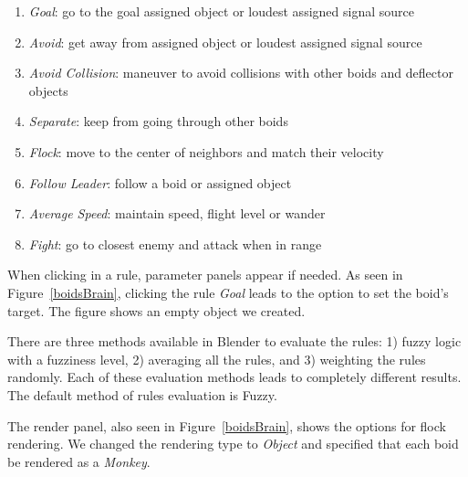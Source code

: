 \begin{enumerate}
\item{\textit{Goal}: go to the goal assigned object or loudest assigned signal source}
\item{\textit{Avoid}: get away from assigned object or loudest assigned signal source}
\item{\textit{Avoid Collision}: maneuver to avoid collisions with other boids and deflector objects} %
\item{\textit{Separate}: keep from going through other boids}
\item{\textit{Flock}: move to the center of neighbors and match their velocity}
\item{\textit{Follow Leader}: follow a boid or assigned object}
\item{\textit{Average Speed}: maintain speed, flight level or wander}
\item{\textit{Fight}: go to closest enemy and attack when in range}
\end{enumerate}

When clicking in a rule, parameter panels appear if needed. As seen in Figure~\ref{boidsBrain}, clicking the rule \textit{Goal} leads to the option to set the boid's target. The figure shows an empty object we created. 

There are three methods available in Blender to evaluate the rules: 1) fuzzy logic with a fuzziness level, 2) averaging all the rules, and 3) weighting the rules randomly. Each of these evaluation methods leads to completely different results. The default method of rules evaluation is Fuzzy.

The render panel, also seen in Figure~\ref{boidsBrain}, shows the options for flock rendering. We changed the rendering type to \textit{Object} and specified that each boid be rendered as a \textit{Monkey}.

